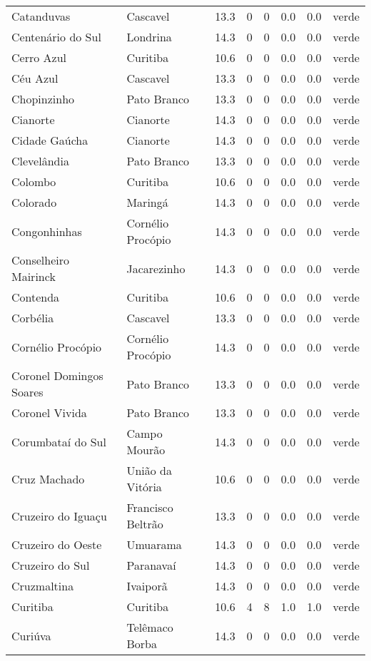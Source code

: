 \begin{longtable}{l|lllllll}
  Catanduvas & Cascavel & 13.3 & 0 & 0 & 0.0 & 0.0 & verde \\ 
  Centenário do Sul & Londrina & 14.3 & 0 & 0 & 0.0 & 0.0 & verde \\ 
  Cerro Azul & Curitiba & 10.6 & 0 & 0 & 0.0 & 0.0 & verde \\ 
  Céu Azul & Cascavel & 13.3 & 0 & 0 & 0.0 & 0.0 & verde \\ 
  Chopinzinho & Pato Branco & 13.3 & 0 & 0 & 0.0 & 0.0 & verde \\ 
  Cianorte & Cianorte & 14.3 & 0 & 0 & 0.0 & 0.0 & verde \\ 
  Cidade Gaúcha & Cianorte & 14.3 & 0 & 0 & 0.0 & 0.0 & verde \\ 
  Clevelândia & Pato Branco & 13.3 & 0 & 0 & 0.0 & 0.0 & verde \\ 
  Colombo & Curitiba & 10.6 & 0 & 0 & 0.0 & 0.0 & verde \\ 
  Colorado & Maringá & 14.3 & 0 & 0 & 0.0 & 0.0 & verde \\ 
  Congonhinhas & Cornélio Procópio & 14.3 & 0 & 0 & 0.0 & 0.0 & verde \\ 
  Conselheiro Mairinck & Jacarezinho & 14.3 & 0 & 0 & 0.0 & 0.0 & verde \\ 
  Contenda & Curitiba & 10.6 & 0 & 0 & 0.0 & 0.0 & verde \\ 
  Corbélia & Cascavel & 13.3 & 0 & 0 & 0.0 & 0.0 & verde \\ 
  Cornélio Procópio & Cornélio Procópio & 14.3 & 0 & 0 & 0.0 & 0.0 & verde \\ 
  Coronel Domingos Soares & Pato Branco & 13.3 & 0 & 0 & 0.0 & 0.0 & verde \\ 
  Coronel Vivida & Pato Branco & 13.3 & 0 & 0 & 0.0 & 0.0 & verde \\ 
  Corumbataí do Sul & Campo Mourão & 14.3 & 0 & 0 & 0.0 & 0.0 & verde \\ 
  Cruz Machado & União da Vitória & 10.6 & 0 & 0 & 0.0 & 0.0 & verde \\ 
  Cruzeiro do Iguaçu & Francisco Beltrão & 13.3 & 0 & 0 & 0.0 & 0.0 & verde \\ 
  Cruzeiro do Oeste & Umuarama & 14.3 & 0 & 0 & 0.0 & 0.0 & verde \\ 
  Cruzeiro do Sul & Paranavaí & 14.3 & 0 & 0 & 0.0 & 0.0 & verde \\ 
  Cruzmaltina & Ivaiporã & 14.3 & 0 & 0 & 0.0 & 0.0 & verde \\ 
  Curitiba & Curitiba & 10.6 & 4 & 8 & 1.0 & 1.0 & verde \\ 
  Curiúva & Telêmaco Borba & 14.3 & 0 & 0 & 0.0 & 0.0 & verde \\ 

\end{longtable}

